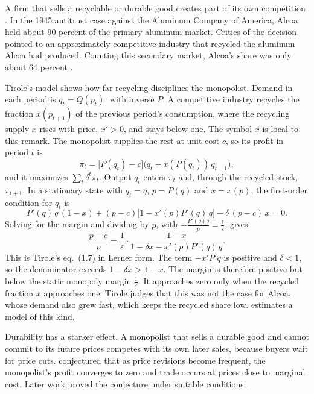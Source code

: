 \begin{remark}\label{rem:02-recycling}
A firm that sells a recyclable or durable good creates part of its own competition \citep[sec.~1.5]{Tirole1988}. In
the 1945 antitrust case against the Aluminum Company of America, Alcoa held about 90 percent of the primary aluminum
market. Critics of the decision pointed to an approximately competitive industry that recycled the aluminum Alcoa had
produced. Counting this secondary market, Alcoa's share was only about 64 percent \citep[sec.~1.5.1]{Tirole1988}.

Tirole's model shows how far recycling disciplines the monopolist. Demand in each period is $q_t = Q(p_t)$, with
inverse $P$. A competitive industry recycles the fraction $x(p_{t+1})$ of the previous period's consumption, where
the recycling supply $x$ rises with price, $x' > 0$, and stays below one. The symbol $x$ is local to this remark. The
monopolist supplies the rest at unit cost $c$, so its profit in period $t$ is
\[
  \pi_t = \bigl[P(q_t) - c\bigr]\bigl(q_t - x(P(q_t))\,q_{t-1}\bigr) ,
\]
and it maximizes $\sum_t \delta^t\pi_t$. Output $q_t$ enters $\pi_t$ and, through the recycled stock, $\pi_{t+1}$.
In a stationary state with $q_t = q$, $p = P(q)$ and $x = x(p)$, the first-order condition for $q_t$ is
\[
  P'(q)\,q\,(1 - x) + (p - c)\bigl[1 - x'(p)P'(q)\,q\bigr] - \delta\,(p - c)\,x = 0 .
\]
Solving for the margin and dividing by $p$, with $-\frac{P'(q)q}{p} = \frac{1}{\varepsilon}$, gives
\[
  \frac{p - c}{p} = \frac{1}{\varepsilon}\cdot\frac{1 - x}{1 - \delta x - x'(p)P'(q)\,q} .
\]
This is Tirole's eq.~(1.7) in Lerner form. The term $-x'P'q$ is positive and $\delta < 1$, so the denominator exceeds
$1 - \delta x > 1 - x$. The margin is therefore positive but below the static monopoly margin $\frac{1}{\varepsilon}$.
It approaches zero only when the recycled fraction $x$ approaches one. Tirole judges that this was not the case for
Alcoa, whose demand also grew fast, which keeps the recycled share low. \citet{Suslow1986} estimates a model of this
kind.

Durability has a starker effect. A monopolist that sells a durable good and cannot commit to its future prices
competes with its own later sales, because buyers wait for price cuts. \citet{Coase1972} conjectured that as price
revisions become frequent, the monopolist's profit converges to zero and trade occurs at prices close to marginal
cost. Later work proved the conjecture under suitable conditions \citep[secs.~1.1.3 and 1.5.2]{Tirole1988}.
\end{remark}


